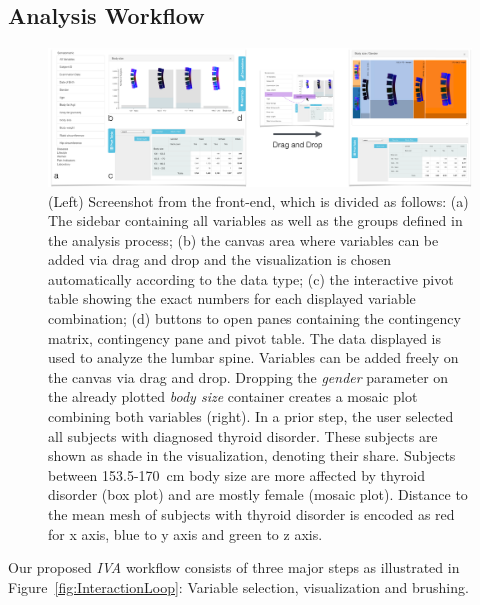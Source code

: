 \documentclass[journal]{style/vgtc} 			          %
\begin{document}
\subsection{Analysis Workflow}
\begin{figure}[htb]
 \centering
 \includegraphics[width=1\textwidth, resolution=300]{figures/visualization}
 \caption{
 (Left) Screenshot from the front-end, which is divided as follows: (a) The sidebar containing all variables as well as the groups defined in the analysis process; (b) the canvas area where variables can be added via drag and drop and the visualization is chosen automatically according to the data type; (c) the interactive pivot table showing the exact numbers for each displayed variable combination; (d) buttons to open panes containing the contingency matrix, contingency pane and pivot table.
 The data displayed is used to analyze the lumbar spine. Variables can be added freely on the canvas via drag and drop.
 Dropping the \emph{gender} parameter on the already plotted \emph{body size} container creates a mosaic plot combining both variables (right).
 In a prior step, the user selected all subjects with diagnosed thyroid disorder.
 These subjects are shown as shade in the visualization, denoting their share.
 Subjects between 153.5-170~cm body size are more affected by thyroid disorder (box plot) and are mostly female (mosaic plot).
 Distance to the mean mesh of subjects with thyroid disorder is encoded as red for x axis, blue to y axis and green to z axis.
 }
 \label{fig:visualization}
\end{figure}
Our proposed \emph{IVA} workflow consists of three major steps as illustrated in Figure~\ref{fig:InteractionLoop}: Variable selection, visualization and brushing.
\end{document}
